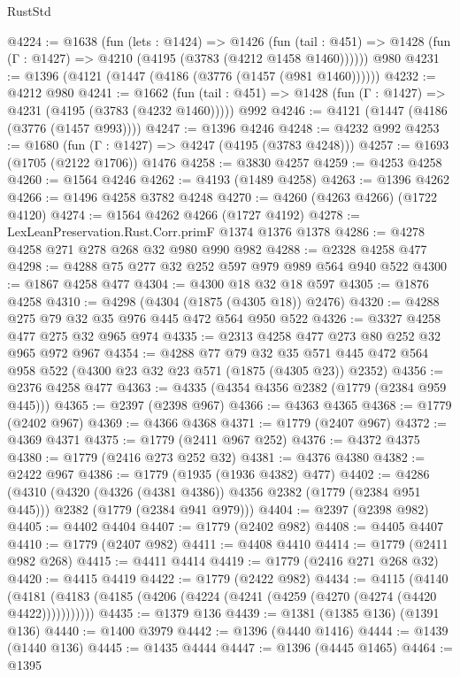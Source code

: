 \begin{lexlean}{RustStd}
\begin{coremodule}
{\begin{coremodule}
{{{{{{{{{{{@4224 := @1638
    (fun (lets : @1424) =>
    @1426
      (fun (tail : @451) => @1428 (fun (Γ : @1427) => @4210 (@4195 (@3783 (@4212 @1458 @1460))))))
    @980
@4231 := @1396 (@4121 (@1447 (@4186 (@3776 (@1457 (@981 @1460))))))
@4232 := @4212 @980
@4241 := @1662
    (fun (tail : @451) => @1428 (fun (Γ : @1427) => @4231 (@4195 (@3783 (@4232 @1460)))))
    @992
@4246 := @4121 (@1447 (@4186 (@3776 (@1457 @993))))
@4247 := @1396 @4246
@4248 := @4232 @992
@4253 := @1680 (fun (Γ : @1427) => @4247 (@4195 (@3783 @4248)))
@4257 := @1693 (@1705 (@2122 @1706)) @1476
@4258 := @3830 @4257
@4259 := @4253 @4258
@4260 := @1564 @4246
@4262 := @4193 (@1489 @4258)
@4263 := @1396 @4262
@4266 := @1496 @4258 @3782 @4248
@4270 := @4260 (@4263 @4266) (@1722 @4120)
@4274 := @1564 @4262 @4266 (@1727 @4192)
@4278 := LexLeanPreservation.Rust.Corr.primF @1374 @1376 @1378
@4286 := @4278 @4258 @271 @278 @268 @32 @980 @990 @982
@4288 := @2328 @4258 @477
@4298 := @4288 @75 @277 @32 @252 @597 @979 @989 @564 @940 @522
@4300 := @1867 @4258 @477
@4304 := @4300 @18 @32 @18 @597
@4305 := @1876 @4258
@4310 := @4298 (@4304 (@1875 (@4305 @18)) @2476)
@4320 := @4288 @275 @79 @32 @35 @976 @445 @472 @564 @950 @522
@4326 := @3327 @4258 @477 @275 @32 @965 @974
@4335 := @2313 @4258 @477 @273 @80 @252 @32 @965 @972 @967
@4354 := @4288
    @77
    @79
    @32
    @35
    @571
    @445
    @472
    @564
    @958
    @522
    (@4300 @23 @32 @23 @571 (@1875 (@4305 @23)) @2352)
@4356 := @2376 @4258 @477
@4363 := @4335 (@4354 @4356 @2382 (@1779 (@2384 @959 @445)))
@4365 := @2397 (@2398 @967)
@4366 := @4363 @4365
@4368 := @1779 (@2402 @967)
@4369 := @4366 @4368
@4371 := @1779 (@2407 @967)
@4372 := @4369 @4371
@4375 := @1779 (@2411 @967 @252)
@4376 := @4372 @4375
@4380 := @1779 (@2416 @273 @252 @32)
@4381 := @4376 @4380
@4382 := @2422 @967
@4386 := @1779 (@1935 (@1936 @4382) @477)
@4402 := @4286
    (@4310
      (@4320 (@4326 (@4381 @4386)) @4356 @2382 (@1779 (@2384 @951 @445)))
      @2382
      (@1779 (@2384 @941 @979)))
@4404 := @2397 (@2398 @982)
@4405 := @4402 @4404
@4407 := @1779 (@2402 @982)
@4408 := @4405 @4407
@4410 := @1779 (@2407 @982)
@4411 := @4408 @4410
@4414 := @1779 (@2411 @982 @268)
@4415 := @4411 @4414
@4419 := @1779 (@2416 @271 @268 @32)
@4420 := @4415 @4419
@4422 := @1779 (@2422 @982)
@4434 := @4115
    (@4140 (@4181 (@4183 (@4185 (@4206 (@4224 (@4241 (@4259 (@4270 (@4274 (@4420 @4422)))))))))))
@4435 := @1379 @136
@4439 := @1381 (@1385 @136) (@1391 @136)
@4440 := @1400 @3979
@4442 := @1396 (@4440 @1416)
@4444 := @1439 (@1440 @136)
@4445 := @1435 @4444
@4447 := @1396 (@4445 @1465)
@4464 := @1395
}}}}}}}}}}}
\end{coremodule}}
\end{coremodule}
\end{lexlean}
